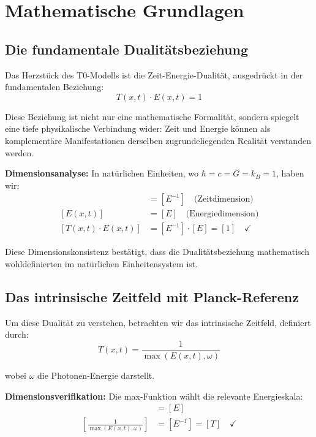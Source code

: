 \documentclass[12pt,a4paper]{report}
\newcommand{\natunits}{\hbar = c = G = k_B = 1} %
\begin{document}
	\section{Mathematische Grundlagen}\label{sec:mathematical_foundations}
	
	\subsection{Die fundamentale Dualitätsbeziehung}\label{subsec:fundamental_duality}
	
	Das Herzstück des T0-Modells ist die Zeit-Energie-Dualität, ausgedrückt in der fundamentalen Beziehung:
	\begin{equation}
		\boxed{T(x,t) \cdot E(x,t) = 1}
		\label{eq:time_energy_duality}
	\end{equation}
	
	Diese Beziehung ist nicht nur eine mathematische Formalität, sondern spiegelt eine tiefe physikalische Verbindung wider: Zeit und Energie können als komplementäre Manifestationen derselben zugrundeliegenden Realität verstanden werden.
	
	\textbf{Dimensionsanalyse:} In natürlichen Einheiten, wo $\natunits$, haben wir:
	\begin{align}
		[T(x,t)] &= [E^{-1}] \quad \text{(Zeitdimension)} \\
		[E(x,t)] &= [E] \quad \text{(Energiedimension)} \\
		[T(x,t) \cdot E(x,t)] &= [E^{-1}] \cdot [E] = [1] \quad \checkmark
	\end{align}
	
	Diese Dimensionskonsistenz bestätigt, dass die Dualitätsbeziehung mathematisch wohldefinierten im natürlichen Einheitensystem ist.
	
	\subsection{Das intrinsische Zeitfeld mit Planck-Referenz}\label{subsec:intrinsic_time_field}
	
	Um diese Dualität zu verstehen, betrachten wir das intrinsische Zeitfeld, definiert durch:
	\begin{equation}
		T(x,t) = \frac{1}{\max(E(x,t), \omega)}
		\label{eq:intrinsic_time_field}
	\end{equation}
	
	wobei $\omega$ die Photonen-Energie darstellt.
	
	\textbf{Dimensionsverifikation:} Die max-Funktion wählt die relevante Energieskala:
	\begin{align}
		[\max(E(x,t), \omega)] &= [E] \\
		\left[\frac{1}{\max(E(x,t), \omega)}\right] &= [E^{-1}] = [T] \quad \checkmark
	\end{align}
	
\end{document}
